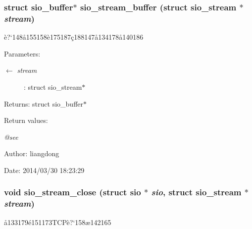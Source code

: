 \subsubsection{\setlength{\rightskip}{0pt plus 5cm}struct sio\_\-buffer$\ast$ sio\_\-stream\_\-buffer (struct sio\_\-stream $\ast$ {\em stream})}\label{sio__stream_8c_a12}


\`{e}?`148\aa{}155158\`{e}175187\c{c}188147\aa{}134178\aa{}140186 

\begin{Desc}
\item[Parameters:]
\begin{description}
\item[\mbox{$\leftarrow$} {\em stream}]: struct sio\_\-stream$\ast$ \end{description}
\end{Desc}
\begin{Desc}
\item[Returns:]struct sio\_\-buffer$\ast$ \end{Desc}
\begin{Desc}
\item[Return values:]
\begin{description}
\item[{\em @see}]\end{description}
\end{Desc}
\begin{Desc}
\item[Author:]liangdong \end{Desc}
\begin{Desc}
\item[Date:]2014/03/30 18:23:29 \end{Desc}
\subsubsection{\setlength{\rightskip}{0pt plus 5cm}void sio\_\-stream\_\-close (struct sio $\ast$ {\em sio}, struct sio\_\-stream $\ast$ {\em stream})}\label{sio__stream_8c_a6}


\aa{}133179\'{e}151173TCP\`{e}?`158\ae{}142165 

